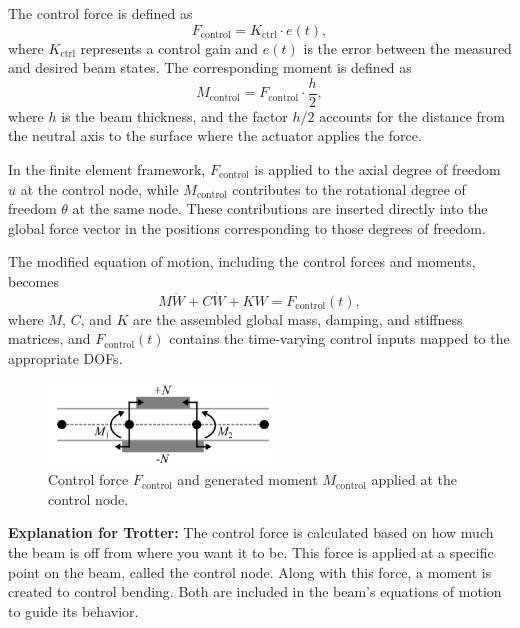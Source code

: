 \documentclass{article}
\begin{document}
	The control force is defined as
	\begin{equation}
		F_{\text{control}} = K_{\text{ctrl}} \cdot e(t),
	\end{equation}
	where \( K_{\text{ctrl}} \) represents a control gain and \( e(t) \) is the error between the measured and desired beam states. The corresponding moment is defined as
	\begin{equation}
		M_{\text{control}} = F_{\text{control}} \cdot \frac{h}{2},
	\end{equation}
	where \( h \) is the beam thickness, and the factor \( h/2 \) accounts for the distance from the neutral axis to the surface where the actuator applies the force.
	
	In the finite element framework, \( F_{\text{control}} \) is applied to the axial degree of freedom \( u \) at the control node, while \( M_{\text{control}} \) contributes to the rotational degree of freedom \( \theta \) at the same node. These contributions are inserted directly into the global force vector in the positions corresponding to those degrees of freedom.
	
	The modified equation of motion, including the control forces and moments, becomes
	\begin{equation}
		M \ddot{W} + C \dot{W} + K W = F_{\text{control}}(t),
	\end{equation}
	where \( M \), \( C \), and \( K \) are the assembled global mass, damping, and stiffness matrices, and \( F_{\text{control}}(t) \) contains the time-varying control inputs mapped to the appropriate DOFs.
	
	\begin{figure}[H]
		\centering
		\includegraphics[width=2.4in]{Figures/ControlForces_Figure.png}
		\caption{Control force \( F_{\text{control}} \) and generated moment \( M_{\text{control}} \) applied at the control node.}
		\label{fig:control_forces}
	\end{figure}
	
	\textbf{Explanation for Trotter:} The control force is calculated based on how much the beam is off from where you want it to be. This force is applied at a specific point on the beam, called the control node. Along with this force, a moment is created to control bending. Both are included in the beam’s equations of motion to guide its behavior.
	
\end{document}
